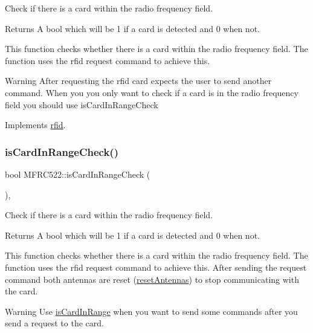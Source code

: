 Check if there is a card within the radio frequency field. 

\begin{DoxyReturn}{Returns}
A bool which will be 1 if a card is detected and 0 when not.
\end{DoxyReturn}
This function checks whether there is a card within the radio frequency field. The function uses the rfid request command to achieve this. \begin{DoxyWarning}{Warning}
After requesting the rfid card expects the user to send another command. When you you only want to check if a card is in the radio frequency field you should use is\+Card\+In\+Range\+Check 
\end{DoxyWarning}


Implements \mbox{\hyperlink{classrfid_a23fc4ec0bc3790c5e68269d4f32771b9}{rfid}}.

\mbox{\label{class_m_f_r_c522_a29ce0dd04495f9352e32ada5ecc5fd03}} 
\subsubsection{\texorpdfstring{is\+Card\+In\+Range\+Check()}{isCardInRangeCheck()}}
{\footnotesize\ttfamily bool M\+F\+R\+C522\+::is\+Card\+In\+Range\+Check (\begin{DoxyParamCaption}{ }\end{DoxyParamCaption})\hspace{0.3cm}{\ttfamily [override]}, {\ttfamily [virtual]}}



Check if there is a card within the radio frequency field. 

\begin{DoxyReturn}{Returns}
A bool which will be 1 if a card is detected and 0 when not.
\end{DoxyReturn}
This function checks whether there is a card within the radio frequency field. The function uses the rfid request command to achieve this. After sending the request command both antennas are reset (\mbox{\hyperlink{class_m_f_r_c522_ac981022cc3ae79f727b2365e309cf691}{reset\+Antennas}}) to stop communicating with the card. \begin{DoxyWarning}{Warning}
Use \mbox{\hyperlink{class_m_f_r_c522_a019f76569bddf9c2f9f94eca13a618d7}{is\+Card\+In\+Range}} when you want to send some commands after you send a request to the card. 
\end{DoxyWarning}


